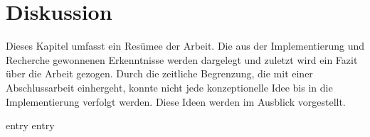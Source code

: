 \chapter{Diskussion}
\label{chap:diskussion}

Dieses Kapitel umfasst ein Resümee der Arbeit.  Die aus der Implementierung und
Recherche gewonnenen Erkenntnisse werden dargelegt und zuletzt wird ein Fazit
über die Arbeit gezogen.  Durch die zeitliche Begrenzung, die mit einer
Abschlussarbeit einhergeht, konnte nicht jede konzeptionelle Idee bis in die
Implementierung verfolgt werden.  Diese Ideen werden im Ausblick vorgestellt.

{entry}
{entry}
